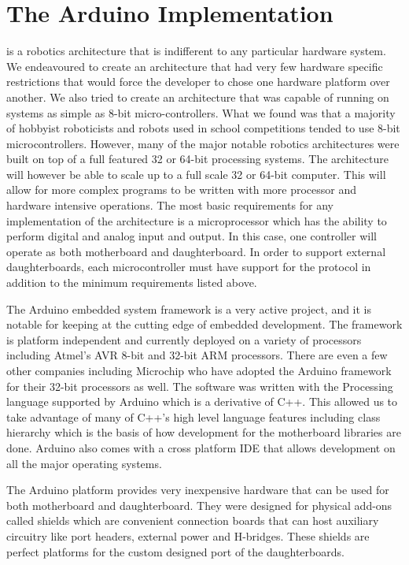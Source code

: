 

\section{The Arduino Implementation} %
\label{sec:the_arduino_implementation}
\xten is a robotics architecture that is indifferent to any particular hardware system. We endeavoured to create an architecture that had very few hardware specific restrictions that would force the developer to chose one hardware platform over another. We also tried to create an architecture that was capable of running on systems as simple as 8-bit micro-controllers. What we found was that a majority of hobbyist roboticists and robots used in school competitions tended to use 8-bit microcontrollers. However, many of the major notable robotics architectures were built on top of a full featured 32 or 64-bit processing systems. The architecture will however be able to scale up to a full scale 32 or 64-bit computer. This will allow for more complex programs to be written with more processor and hardware intensive operations. The most basic requirements for any implementation of the \xten architecture is a microprocessor which has the ability to perform digital and analog input and output. In this case, one controller will operate as both motherboard and daughterboard. In order to support external daughterboards, each microcontroller must have support for the \iic protocol in addition to the minimum requirements listed above.

The Arduino embedded system framework is a very active project, and it is notable for keeping at the cutting edge of embedded development. The framework is platform independent and currently deployed on a variety of processors including Atmel's AVR 8-bit and 32-bit ARM processors. There are even a few other companies including Microchip who have adopted the Arduino framework for their 32-bit processors as well. 
The \xten software was written with the Processing language supported by Arduino which is a derivative of C++. This allowed us to take advantage of many of C++'s high level language features including class hierarchy which is the basis of how development for the motherboard libraries are done. Arduino also comes with a cross platform IDE that allows development on all the major operating systems.

The Arduino platform provides very inexpensive hardware that can be used for both motherboard and daughterboard. They were designed for physical add-ons called shields which are convenient connection boards that can host auxiliary circuitry like port headers, external power and H-bridges. These shields are perfect platforms for the custom designed port of the \xten daughterboards.


